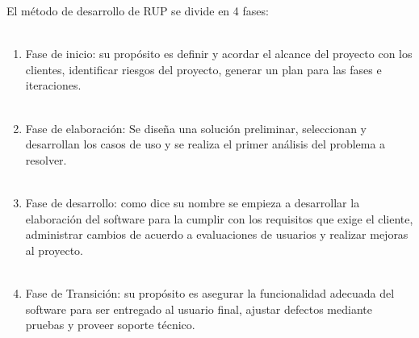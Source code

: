 \documentclass[10pt,a4paper]{article}
\begin{document}
 El m\' etodo de desarrollo de RUP se divide en 4 fases:\\\
\begin{enumerate}

\item Fase de inicio: su prop\' osito es definir y 
acordar el alcance del proyecto con los clientes, identificar 
riesgos del proyecto, generar un plan para las fases e iteraciones. \\\
\item Fase de elaboraci\' on: Se dise\~na una soluci\' on preliminar, 
seleccionan y desarrollan los casos de uso y se realiza
 el primer an\' alisis del problema a resolver. \\\
\item Fase de desarrollo: como dice su nombre se 
empieza a desarrollar la elaboraci\' on del software
 para la cumplir con los requisitos que exige el cliente,
  administrar cambios de acuerdo a evaluaciones de usuarios
   y realizar mejoras al proyecto. \\\
\item Fase de Transici\' on: su prop\' osito es asegurar
 la funcionalidad adecuada del software para ser entregado
  al usuario final, ajustar defectos mediante pruebas
   y proveer soporte t\' ecnico.\\\\

\end{enumerate}
\end{document}
